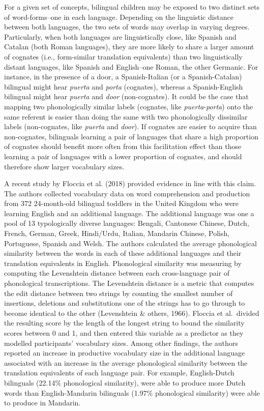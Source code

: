 \documentclass[
  english,
  man,man,floatsintext]{apa6}
\begin{document}
For a given set of concepts, bilingual children may be exposed to two distinct sets of word-forms--one in each language. Depending on the linguistic distance between both languages, the two sets of words may overlap in varying degrees. Particularly, when both languages are linguistically close, like Spanish and Catalan (both Roman languages), they are more likely to share a larger amount of cognates (i.e., form-similar translation equivalents) than two linguistically distant languages, like Spanish and English--one Roman, the other Germanic. For instance, in the presence of a door, a Spanish-Italian (or a Spanish-Catalan) bilingual might hear \emph{puerta} and \emph{porta} (cognates), whereas a Spanish-English bilingual might hear \emph{puerta} and \emph{door} (non-cognates). It could be the case that mapping two phonologically similar labels (cognates, like \emph{puerta}-\emph{porta}) onto the same referent is easier than doing the same with two phonologically dissimilar labels (non-cognates, like \emph{puerta} and \emph{door}). If cognates are easier to acquire than non-cognates, bilinguals learning a pair of languages that share a high proportion of cognates should benefit more often from this facilitation effect than those learning a pair of languages with a lower proportion of cognates, and should therefore show larger vocabulary sizes.

A recent study by Floccia et al. (2018) provided evidence in line with this claim. The authors collected vocabulary data on word comprehension and production from 372 24-month-old bilingual toddlers in the United Kingdom who were learning English and an additional language. The additional language was one a pool of 13 typologically diverse languages: Bengali, Cantonese Chinese, Dutch, French, German, Greek, Hindi/Urdu, Italian, Mandarin Chinese, Polish, Portuguese, Spanish and Welsh. The authors calculated the average phonological similarity between the words in each of these additional languages and their translation equivalents in English. Phonological similarity was measuring by computing the Levenshtein distance between each cross-language pair of phonological transcriptions. The Levenshtein distance is a metric that computes the edit distance between two strings by counting the smallest number of insertions, deletions and substitutions one of the strings has to go through to become identical to the other (Levenshtein \& others, 1966). Floccia et al.~divided the resulting score by the length of the longest string to bound the similarity scores between 0 and 1, and then entered this variable as a predictor as they modelled participants' vocabulary sizes. Among other findings, the authors reported an increase in productive vocabulary size in the additional language associated with an increase in the average phonological similarity between the translation equivalents of each language pair. For example, English-Dutch bilinguals (22.14\% phonological similarity), were able to produce more Dutch words than English-Mandarin bilinguals (1.97\% phonological similarity) were able to produce in Mandarin.
\end{document}
